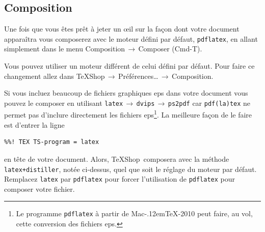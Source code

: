\documentclass[11pt,french]{article}
\newcommand{\MacTeX}{Mac\kern-.12em\TeX}
\newcommand{\TS}{\textsf{\TeX Shop}}
\newcommand{\acr}[1]{\textsf{#1}}
\newcommand{\cmd}[1]{\textsf{#1}}
\newcommand{\mnu}[1]{\textsf{#1}}
\newcommand{\To}{\,\(\to\)\,}
\begin{document}
\subsection{Composition}

Une fois que vous êtes prêt à jeter un \oe{}il sur la façon dont votre document apparaîtra vous composerez avec le moteur défini par défaut, \texttt{pdflatex}, en allant simplement dans le menu \mnu{Composition}\To\mnu{Composer} (\cmd{Cmd-T}).

Vous pouvez utiliser un moteur différent de celui défini par défaut. Pour faire ce changement allez dans \mnu{TeXShop}\To\mnu{Préférences…}\To\mnu{Composition}.

Si vous incluez beaucoup de fichiers graphiques \acr{eps} dans votre document vous pouvez le composer en utilisant \texttt{latex}\To\texttt{dvips}\To\texttt{ps2pdf} car \texttt{pdf(la)tex} ne permet pas d'inclure directement les fichiers \acr{eps}\footnote{Le programme \texttt{pdflatex} à partir de \MacTeX-2010 peut faire, au vol, cette conversion des fichiers \acr{eps}.}. La meilleure façon de le faire est d'entrer la ligne
\begin{verbatim}
%%! TEX TS-program = latex
\end{verbatim}
en tête de votre document. Alors, \TS\ composera avec la méthode \texttt{latex+distiller}, notée ci-dessus, quel que soit le réglage du moteur par défaut. Remplacez \texttt{latex} par \texttt{pdflatex} pour forcer l'utilisation de \texttt{pdflatex} pour composer votre fichier.

%
%
\end{document}
